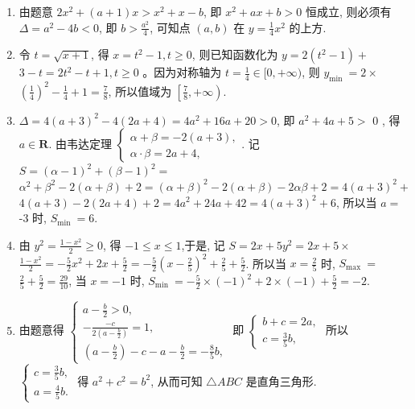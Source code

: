 \documentclass[10pt]{article}
\begin{document}
\begin{enumerate}
(第2 题)\\
$7 z=3 z-2$ ，得 $-\frac{5}{7} \leqslant u \leqslant-\frac{1}{11}$.
  \item 由题意 $2 x^{2}+(a+1) x>x^{2}+x-b$, 即 $x^{2}+a x+b>0$ 恒成立, 则必须有 $\Delta=a^{2}-4 b<0$, 即 $b>\frac{a^{2}}{4}$, 可知点 $(a, b)$ 在 $y=\frac{1}{4} x^{2}$ 的上方.
  \item 令 $t=\sqrt{x+1}$, 得 $x=t^{2}-1, t \geqslant 0$, 则已知函数化为 $y=2\left(t^{2}-1\right)+$ $3-t=2 t^{2}-t+1, t \geqslant 0$ 。因为对称轴为 $t=\frac{1}{4} \in[0,+\infty)$, 则 $y_{\text {min }}=2 \times$ $\left(\frac{1}{4}\right)^{2}-\frac{1}{4}+1=\frac{7}{8}$, 所以值域为 $\left[\frac{7}{8},+\infty\right)$.
  \item $\Delta=4(a+3)^{2}-4(2 a+4)=4 a^{2}+16 a+20>0$, 即 $a^{2}+4 a+5>$ 0 , 得 $a \in \mathbf{R}$. 由韦达定理 $\left\{\begin{array}{l}\alpha+\beta=-2(a+3), \\ \alpha \cdot \beta=2 a+4,\end{array}\right.$. 记 $S=(\alpha-1)^{2}+(\beta-1)^{2}=$ $\alpha^{2}+\beta^{2}-2(\alpha+\beta)+2=(\alpha+\beta)^{2}-2(\alpha+\beta)-2 \alpha \beta+2=4(a+3)^{2}+$ $4(a+3)-2(2 a+4)+2=4 a^{2}+24 a+42=4(a+3)^{2}+6$, 所以当 $a=$ -3 时, $S_{\text {min }}=6$.
  \item 由 $y^{2}=\frac{1-x^{2}}{2} \geqslant 0$, 得 $-1 \leqslant x \leqslant 1$,于是, 记 $S=2 x+5 y^{2}=2 x+5 \times$ $\frac{1-x^{2}}{2}=-\frac{5}{2} x^{2}+2 x+\frac{5}{2}=-\frac{5}{2}\left(x-\frac{2}{5}\right)^{2}+\frac{2}{5}+\frac{5}{2}$. 所以当 $x=\frac{2}{5}$ 时, $S_{\text {max }}=$ $\frac{2}{5}+\frac{5}{2}=\frac{29}{10}$, 当 $x=-1$ 时, $S_{\text {min }}=-\frac{5}{2} \times(-1)^{2}+2 \times(-1)+\frac{5}{2}=-2$.
  \item 由题意得 $\left\{\begin{array}{l}a-\frac{b}{2}>0, \\ -\frac{-c}{2\left(a-\frac{b}{2}\right)}=1, \\ \left(a-\frac{b}{2}\right)-c-a-\frac{b}{2}=-\frac{8}{5} b,\end{array}\right.$ 即 $\left\{\begin{array}{l}b+c=2 a, \\ c=\frac{3}{5} b,\end{array}\right.$ 所以 $\left\{\begin{array}{l}c=\frac{3}{5} b, \\ a=\frac{4}{5} b .\end{array}\right.$ 得 $a^{2}+c^{2}=b^{2}$, 从而可知 $\triangle A B C$ 是直角三角形.

\end{enumerate}
\end{document}

